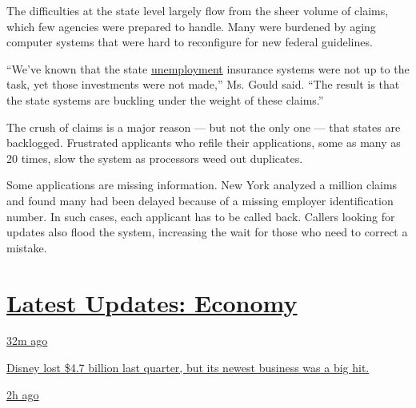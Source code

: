 The difficulties at the state level largely flow from the sheer volume
of claims, which few agencies were prepared to handle. Many were
burdened by aging computer systems that were hard to reconfigure for new
federal guidelines.

``We've known that the state
\href{https://www.nytimes.com/2020/05/28/business/economy/coronavirus-unemployment-claims.html}{unemployment}
insurance systems were not up to the task, yet those investments were
not made,'' Ms. Gould said. ``The result is that the state systems are
buckling under the weight of these claims.''

The crush of claims is a major reason --- but not the only one --- that
states are backlogged. Frustrated applicants who refile their
applications, some as many as 20 times, slow the system as processors
weed out duplicates.

Some applications are missing information. New York analyzed a million
claims and found many had been delayed because of a missing employer
identification number. In such cases, each applicant has to be called
back. Callers looking for updates also flood the system, increasing the
wait for those who need to correct a mistake.

\hypertarget{latest-updates-economy}{%
\section{\texorpdfstring{\href{https://www.nytimes.com/live/2020/08/04/business/stock-market-today-coronavirus?action=click\&pgtype=Article\&state=default\&region=MAIN_CONTENT_1\&context=storylines_live_updates}{Latest
Updates:
Economy}}{Latest Updates: Economy}}\label{latest-updates-economy}}

\href{https://www.nytimes.com/live/2020/08/04/business/stock-market-today-coronavirus?action=click\&pgtype=Article\&state=default\&region=MAIN_CONTENT_1\&context=storylines_live_updates\#disney-lost-4-7-billion-last-quarter-but-its-newest-business-was-a-big-hit}{32m
ago}

\href{https://www.nytimes.com/live/2020/08/04/business/stock-market-today-coronavirus?action=click\&pgtype=Article\&state=default\&region=MAIN_CONTENT_1\&context=storylines_live_updates\#disney-lost-4-7-billion-last-quarter-but-its-newest-business-was-a-big-hit}{Disney
lost \$4.7 billion last quarter, but its newest business was a big hit.}

\href{https://www.nytimes.com/live/2020/08/04/business/stock-market-today-coronavirus?action=click\&pgtype=Article\&state=default\&region=MAIN_CONTENT_1\&context=storylines_live_updates\#the-ad-giant-publicis-has-parted-ways-with-an-executive-over-his-virus-tweets}{2h
ago}


